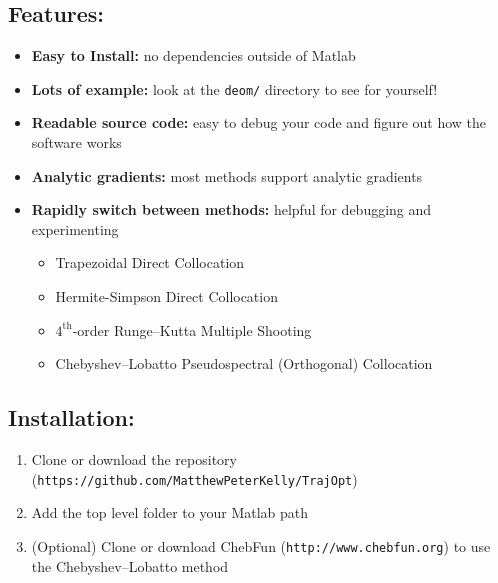 \cite{Betts2010}

\subsection{Features:}
\begin{itemize} \setlength\itemsep{-0.1em}
\item {\bf Easy to Install: } no dependencies outside of Matlab \footnotemark
\item {\bf Lots of example: } look at the \texttt{deom/} directory to see for yourself!
\item {\bf Readable source code: } easy to debug your code and figure out how the software works
\item {\bf Analytic gradients: } most methods support analytic gradients
\item {\bf Rapidly switch between methods: } helpful for debugging and experimenting
 	\begin{itemize} \setlength\itemsep{-0.1em}
 	\item Trapezoidal Direct Collocation
 	\item Hermite-Simpson Direct Collocation
 	\item $4^\text{th}$-order Runge--Kutta Multiple Shooting
 	\item Chebyshev--Lobatto Pseudospectral (Orthogonal) Collocation 
 	\end{itemize}
\end{itemize}

\subsection{Installation:}
\begin{enumerate} \setlength\itemsep{-0.1em}
\item Clone or download the repository (\texttt{https://github.com/MatthewPeterKelly/TrajOpt})
\item Add the top level folder to your Matlab path
\item (Optional) Clone or download ChebFun (\texttt{http://www.chebfun.org}) to use the Chebyshev--Lobatto method
\end{enumerate}

